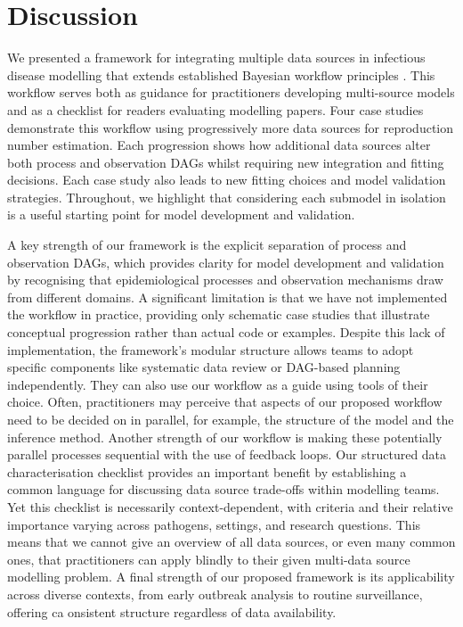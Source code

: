 \documentclass{article}
\begin{document}
\section{Discussion}


We presented a framework for integrating multiple data sources in infectious disease modelling that extends established Bayesian workflow principles \citep{gelman2020bayesian}.
This workflow serves both as guidance for practitioners developing multi-source models and as a checklist for readers evaluating modelling papers.
Four case studies demonstrate this workflow using progressively more data sources for reproduction number estimation.
Each progression shows how additional data sources alter both process and observation DAGs whilst requiring new integration and fitting decisions.
Each case study also leads to new fitting choices and model validation strategies.
Throughout, we highlight that considering each submodel in isolation is a useful starting point for model development and validation.


A key strength of our framework is the explicit separation of process and observation DAGs, which provides clarity for model development and validation by recognising that epidemiological processes and observation mechanisms draw from different domains.
A significant limitation is that we have not implemented the workflow in practice, providing only schematic case studies that illustrate conceptual progression rather than actual code or examples.
Despite this lack of implementation, the framework's modular structure allows teams to adopt specific components like systematic data review or DAG-based planning independently.
They can also use our workflow as a guide using tools of their choice.
Often, practitioners may perceive that aspects of our proposed workflow need to be decided on in parallel, for example, the structure of the model and the inference method.
Another strength of our workflow is making these potentially parallel processes sequential with the use of feedback loops.
Our structured data characterisation checklist provides an important benefit by establishing a common language for discussing data source trade-offs within modelling teams.
Yet this checklist is necessarily context-dependent, with criteria and their relative importance varying across pathogens, settings, and research questions.
This means that we cannot give an overview of all data sources, or even many common ones, that practitioners can apply blindly to their given multi-data source modelling problem.
A final strength of our proposed framework is its applicability across diverse contexts, from early outbreak analysis to routine surveillance, offering ca onsistent structure regardless of data availability.
\end{document}
